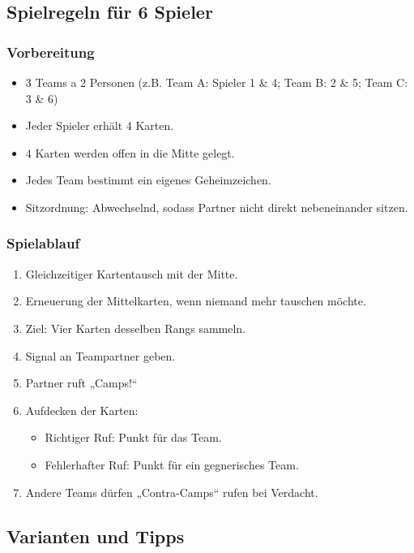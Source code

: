 \subsection*{Spielregeln für 6 Spieler}

\subsubsection*{Vorbereitung}

\begin{itemize}
    \item 3 Teams a 2 Personen (z.B. Team A: Spieler 1 \& 4; Team B: 2 \& 5; Team C: 3 \& 6)
    \item Jeder Spieler erhält 4 Karten.
    \item 4 Karten werden offen in die Mitte gelegt.
    \item Jedes Team bestimmt ein eigenes Geheimzeichen.
    \item Sitzordnung: Abwechselnd, sodass Partner nicht direkt nebeneinander sitzen.
\end{itemize}

\subsubsection*{Spielablauf}

\begin{enumerate}
    \item Gleichzeitiger Kartentausch mit der Mitte.
    \item Erneuerung der Mittelkarten, wenn niemand mehr tauschen möchte.
    \item Ziel: Vier Karten desselben Rangs sammeln.
    \item Signal an Teampartner geben.
    \item Partner ruft „Camps!“
    \item Aufdecken der Karten:
    \begin{itemize}
        \item Richtiger Ruf: Punkt für das Team.
        \item Fehlerhafter Ruf: Punkt für ein gegnerisches Team.
    \end{itemize}
    \item Andere Teams dürfen „Contra-Camps“ rufen bei Verdacht.
\end{enumerate}

\subsection*{Varianten und Tipps}

